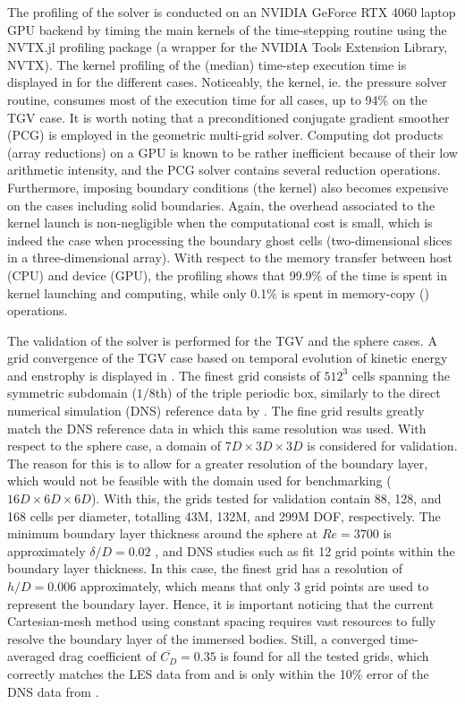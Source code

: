 \documentclass[10pt,a4paper]{article}
\begin{document}
The profiling of the solver is conducted on an NVIDIA GeForce RTX 4060 laptop GPU backend by timing the main kernels of the time-stepping routine using the NVTX.jl profiling package \citep{Byrne2023} (a wrapper for the NVIDIA Tools Extension Library, NVTX). The kernel profiling of the (median) time-step execution time is displayed in  for the different cases. Noticeably, the  kernel, ie. the pressure solver routine, consumes most of the execution time for all cases, up to 94\% on the TGV case. It is worth noting that a preconditioned conjugate gradient smoother (PCG) is employed in the geometric multi-grid solver. Computing dot products (array reductions) on a GPU is known to be rather inefficient because of their low arithmetic intensity, and the PCG solver contains several reduction operations. Furthermore, imposing boundary conditions (the  kernel) also becomes expensive on the cases including solid boundaries. Again, the overhead associated to the kernel launch is non-negligible when the computational cost is small, which is indeed the case when processing the boundary ghost cells (two-dimensional slices in a three-dimensional array). With respect to the memory transfer between host (CPU) and device (GPU), the profiling shows that 99.9\% of the time is spent in kernel launching and computing, while only 0.1\% is spent in memory-copy () operations.

The validation of the solver is performed for the TGV and the sphere cases. A grid convergence of the TGV case based on temporal evolution of kinetic energy and enstrophy is displayed in . The finest grid consists of $512^3$ cells spanning the symmetric subdomain ($1/8$th) of the triple periodic box, similarly to the direct numerical simulation (DNS) reference data by \cite{Dairay2017}. The fine grid results greatly match the DNS reference data in which this same resolution was used. With respect to the sphere case, a domain of $7D\times3D\times3D$ is considered for validation. The reason for this is to allow for a greater resolution of the boundary layer, which would not be feasible with the domain used for benchmarking ($16D\times6D\times6D$). With this, the grids tested for validation contain 88, 128, and 168 cells per diameter, totalling 43M, 132M, and 299M DOF, respectively. The minimum boundary layer thickness around the sphere at $Re=3700$ is approximately $\delta/D=0.02$ \citep{Capuano2023}, and DNS studies such as \cite{Rodriguez2011} fit 12 grid points within the boundary layer thickness. In this case, the finest grid has a resolution of $h/D=0.006$ approximately, which means that only 3 grid points are used to represent the boundary layer. Hence, it is important noticing that the current Cartesian-mesh method using constant spacing requires vast resources to fully resolve the boundary layer of the immersed bodies. Still, a converged time-averaged drag coefficient of $\overline{C_D}=0.35$ is found for all the tested grids, which correctly matches the LES data from \cite{Yun2006} and is only within the 10\% error of the DNS data from \cite{Rodriguez2011}.
\end{document}
